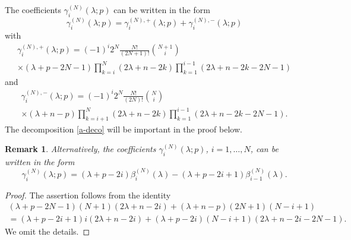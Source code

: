 \documentclass[a4paper,12pt,reqno]{amsart}
\newtheorem{bem}[theorem]{Remark}
\numberwithin{theorem}{subsection}
\numberwithin{equation}{section}
\begin{document}
The coefficients $\gamma_i^{(N)}(\lambda;p)$ can be written in the form
\begin{equation}\label{a-deco}
   \gamma_i^{(N)}(\lambda;p) = \gamma_i^{(N),+}(\lambda;p) + \gamma_i^{(N),-}(\lambda;p)
\end{equation}
with
\begin{multline}\label{a+-coeff}
   \gamma_i^{(N),+}(\lambda;p) = (-1)^i 2^N \frac{N!}{(2N\!+\!1)!} \binom{N+1}{i} \\
   \times (\lambda\!+\!p\!-\!2N\!-\!1) \prod_{k=i}^N (2\lambda\!+\!n\!-\!2k)
   \prod_{k=1}^{i-1} (2\lambda\!+\!n\!-\!2k\!-\!2N\!-\!1)
\end{multline}
and
\begin{multline}\label{a--coeff}
   \gamma^{(N),-}_i(\lambda;p) = (-1)^i 2^N \frac{N!}{(2N)!} \binom{N}{i} \\
   \times (\lambda\!+\!n\!-\!p) \prod_{k=i+1}^N (2\lambda\!+\!n\!-\!2k)
   \prod_{k=1}^{i-1}(2\lambda\!+\!n\!-\!2k\!-\!2N\!-\!1).
\end{multline}
The decomposition \eqref{a-deco} will be important in the proof below.

\begin{bem}\label{gamma-alternative} Alternatively, the coefficients
$\gamma_i^{(N)}(\lambda;p)$, $i=1,\dots,N$, can be written in the form
\begin{equation}\label{gamma-alt}
   \gamma_i^{(N)}(\lambda;p) = (\lambda\!+\!p\!-\!2i) \beta_i^{(N)}(\lambda) -
   (\lambda\!+\!p\!-\!2i\!+\!1) \beta_{i-1}^{(N)}(\lambda).
\end{equation}
\end{bem}

\begin{proof} The assertion follows from the identity
\begin{multline*}
   (\lambda\!+\!p\!-\!2N\!-\!1)(N\!+\!1)(2\lambda\!+\!n\!-\!2i) +
   (\lambda\!+\!n\!-\!p)(2N\!+\!1)(N\!-\!i\!+\!1) \\
   = (\lambda\!+\!p\!-\!2i\!+\!1)i(2\lambda\!+\!n\!-\!2i)
   + (\lambda\!+\!p\!-\!2i)(N\!-\!i\!+\!1)(2\lambda\!+\!n\!-\!2i\!-\!2N\!-\!1).
\end{multline*}
We omit the details.
\end{proof}
\end{document}

